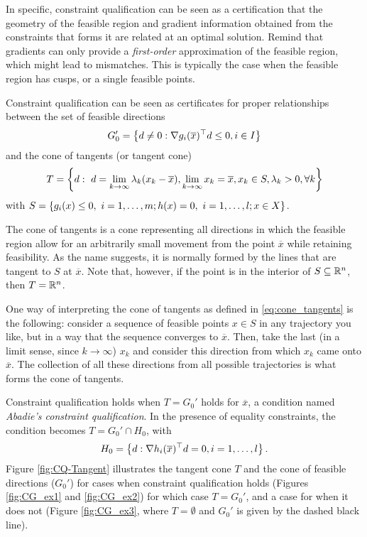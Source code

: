 In specific, constraint qualification can be seen as a certification that the geometry of the feasible region and gradient information obtained from the constraints that forms it are related at an optimal solution. Remind that gradients can only provide a \emph{first-order} approximation of the feasible region, which might lead to mismatches. This is typically the case when the feasible region has cusps, or a single feasible points. 

Constraint qualification can be seen as certificates for proper relationships between the set of feasible directions
\begin{align*}
G_0' = \left\{ d \neq 0: \nabla g_i (\overline{x})^\top d \leq 0, i \in I \right \}	
\end{align*}
%
and the cone of tangents (or tangent cone)
\begin{align}
	T = \left\{ d : \ d = \lim_{k \rightarrow \infty}\lambda_k(x_k - \overline{x}), \lim_{k \rightarrow \infty}x_k = \overline{x}, 
            x_k \in S, \lambda_k > 0, \forall k \right \} \label{eq:cone_tangents}
\end{align}
%
with $S = \left\{ g_i(x) \leq 0, \ i = 1, \dots, m; h(x) = 0, \ i = 1, \dots, l; x \in X \right \}$. 

The cone of tangents is a cone representing all directions in which the feasible region allow for an arbitrarily small movement from the point $\overline{x}$ while retaining feasibility. As the name suggests, it is normally formed by the lines that are tangent to $S$ at $\overline{x}$. Note that, however, if the point is in the interior of $S \subseteq \mathbb{R}^n$, then $T = \mathbb{R}^n$. 

One way of interpreting the cone of tangents as defined in  \eqref{eq:cone_tangents} is the following: consider a sequence of feasible points $x \in S$ in any trajectory you like, but in a way that the sequence converges to $\overline{x}$. Then, take the last (in a limit sense, since $k \rightarrow \infty$) $x_k$ and consider this direction from which $x_k$ came onto $\overline{x}$. The collection of all these directions from all possible trajectories is what forms the cone of tangents.  

Constraint qualification holds when $T = G_0'$ holds for $\overline{x}$, a condition named \emph{Abadie's constraint qualification}. In the presence of equality constraints, the condition becomes $T = G_0' \cap H_0$, with 
%
\begin{align*}
	H_0 = \left\{ d: \nabla h_i(\overline{x})^\top d = 0, i =1, \dots, l \right \}.
\end{align*} 
%
Figure \ref{fig:CQ-Tangent} illustrates the tangent cone $T$ and the cone of feasible directions ($G_0'$) for cases when constraint qualification holds (Figures \ref{fig:CG_ex1} and \ref{fig:CG_ex2}) for which case $T = G_0'$, and a case for when it does not (Figure \ref{fig:CG_ex3}, where $T = \emptyset$ and $G_0'$ is given by the dashed black line). 
%

